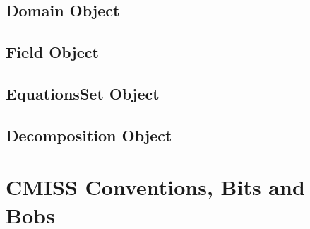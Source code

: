 \subsection{Domain Object}
\label{sec:devel_domain}

\subsection{Field Object}
\label{sec:devel_field}

\subsection{EquationsSet Object}
\label{sec:devel_equationsset}

\subsection{Decomposition Object}
\label{sec:devel_decomposition}

\section{CMISS Conventions, Bits and Bobs}
% 
